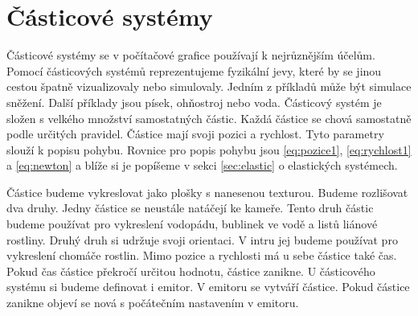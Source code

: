 
\section{Částicové systémy}

Částicové systémy se v počítačové grafice používají k nejrůznějším účelům.
Pomocí čá\-sti\-co\-vých systémů reprezentujeme fyzikální jevy, které by se jinou cestou špatně vizualizovaly nebo simulovaly.
Jedním z příkladů může být simulace sněžení.
Další příklady jsou písek, ohňostroj nebo voda.
Částicový systém je složen s velkého množství samostatných částic.
Každá částice se chová samostatně podle určitých pravidel.
Částice mají svoji pozici a rychlost.
Tyto parametry slouží k popisu pohybu.
Rovnice pro popis pohybu jsou \ref{eq:pozice1}, \ref{eq:rychlost1} a \ref{eq:newton} a blíže si je popíšeme v sekci \ref{sec:elastic} o elastických systémech.

Částice budeme vykreslovat jako plošky s nanesenou texturou.
Budeme rozlišovat dva druhy.
Jedny částice se neustále natáčejí ke kameře.
Tento druh částic budeme používat pro vykreslení vodopádu, bublinek ve vodě a listů liánové rostliny.
Druhý druh si udržuje svoji orientaci.
V intru jej budeme používat pro vykreslení chomáče rostlin.
Mimo pozice a rychlosti má u sebe částice také čas.
Pokud čas částice překročí určitou hodnotu, částice zanikne.
U částicového systému si budeme definovat i emitor.
V emitoru se vytváří částice.
Pokud částice zanikne objeví se nová s počátečním nastavením v emitoru.





